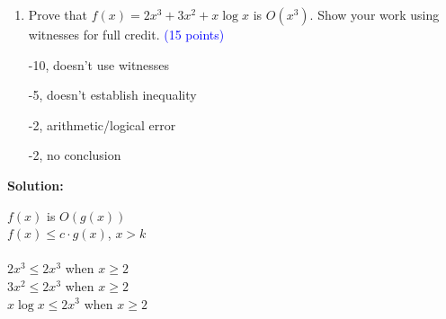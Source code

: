 \documentclass{article}
\newcommand{\pt}[1]{\textcolor{blue}{(#1 points)}}
\newenvironment{solution}
{
\par
\color{blue}
\textbf{Solution:}
}
{
\par
}
\newenvironment{rubric}
{
\par
\begin{spacing}{.6}
\begin{itshape}
\color{red}

}
{
\end{itshape}
\end{spacing}
\par
}
\begin{document}
\begin{enumerate}
\begin{rubric}
    -6, error in Euclidean algorithm/airthmetic
\end{rubric}

\begin{solution}\\
$64=12(5)+4$\\
$12=4(3)+0$\\
 \\
$4=(1)64+(-5)12$
$s=1, t=-5$
\end{solution}

\item Prove that $f(x) = 2x^3 + 3x^2 + x\log{x}$ is $O(x^3)$. Show your work using witnesses for full credit. \pt{15}
\begin{rubric}
-10, doesn't use witnesses

-5, doesn't establish inequality

-2, arithmetic/logical error

-2, no conclusion
\end{rubric}

\end{enumerate}

\begin{solution}
 $f(x)$ is $O(g(x))$\\
$f(x) \leq c \cdot g(x)$, $x>k$\\
\\
$2x^3 \leq 2x^3$ when $x \geq 2$ \\
$3x^2 \leq 2x^3$ when $x \geq 2$ \\
$x \log x \leq 2x^3$ when $x \geq 2$ \\
\end{solution}
\end{document}
